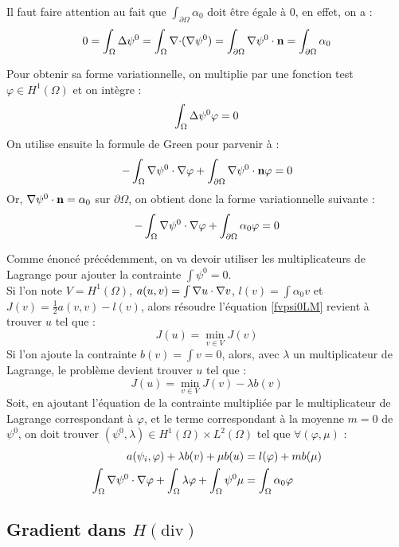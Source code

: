 Il faut faire attention au fait que $\int_{\partial\Omega} \alpha_0$ doit être égale à 0, en effet, on a :
\[ 0=\int_\Omega {\Delta} \psi^0 = \int_\Omega {\nabla\cdot}({\nabla}\psi^0) = \int_{\partial\Omega} {\nabla}\psi^0\cdot \mathbf{n} = \int_{\partial\Omega} \alpha_0 \]

Pour obtenir sa forme variationnelle, on multiplie par une fonction test $\varphi\in H^1(\Omega)$ et on intègre :
\[ \int_\Omega {\Delta}\psi^0 \varphi = 0 \]
On utilise ensuite la formule de Green pour parvenir à :
\[ -\int_\Omega {\nabla}\psi^0\cdot{\nabla}\varphi + \int_{\partial\Omega} {\nabla}\psi^0\cdot \mathbf{n}\varphi = 0 \]
Or, ${\nabla}\psi^0\cdot \mathbf{n} = \alpha_0$ sur $\partial\Omega$, on obtient donc la forme variationnelle suivante :
\begin{equation}\label{fvpsi0LM} -\int_\Omega {\nabla}\psi^0\cdot{\nabla}\varphi + \int_{\partial\Omega} \alpha_0\varphi = 0
\end{equation}

Comme énoncé précédemment, on va devoir utiliser les multiplicateurs de Lagrange pour ajouter la contrainte $\int \psi^0=0$.\\
Si l'on note $V=H^1(\Omega)$, $a(u,v)=\int {\nabla} u \cdot {\nabla} v$, $l(v)=\int \alpha_0v$ et $J(v)=\frac{1}{2}a(v,v)-l(v)$, alors résoudre l'équation \ref{fvpsi0LM} revient à trouver $u$ tel que :
\[ J(u) = \min_{v\in V} J(v) \]
Si l'on ajoute la contrainte $b(v) = \int v = 0$, alors, avec $\lambda$ un multiplicateur de Lagrange, le problème devient trouver $u$ tel que :
\[ J(u) = \min_{v\in V} J(v) - \lambda b(v) \]
Soit, en ajoutant l'équation de la contrainte multipliée par le multiplicateur de Lagrange correspondant à $\varphi$, et le terme correspondant à la moyenne $m=0$ de $\psi^0$, on doit trouver $(\psi^0,\lambda)\in H^1(\Omega)\times L^2(\Omega)$ tel que $\forall (\varphi,\mu)$ :
\begin{align}\label{fvpsi0}
a(\psi_i,\varphi) + \lambda b(v) + \mu b(u) &= l(\varphi) + m b(\mu) \notag \\
\int_\Omega {\nabla}\psi^0\cdot{\nabla}\varphi + \int_\Omega \lambda\varphi + \int_\Omega \psi^0\mu &= \int_\Omega \alpha_0\varphi
\end{align}

\subsection{Gradient dans $H(\mathrm{div})$}

